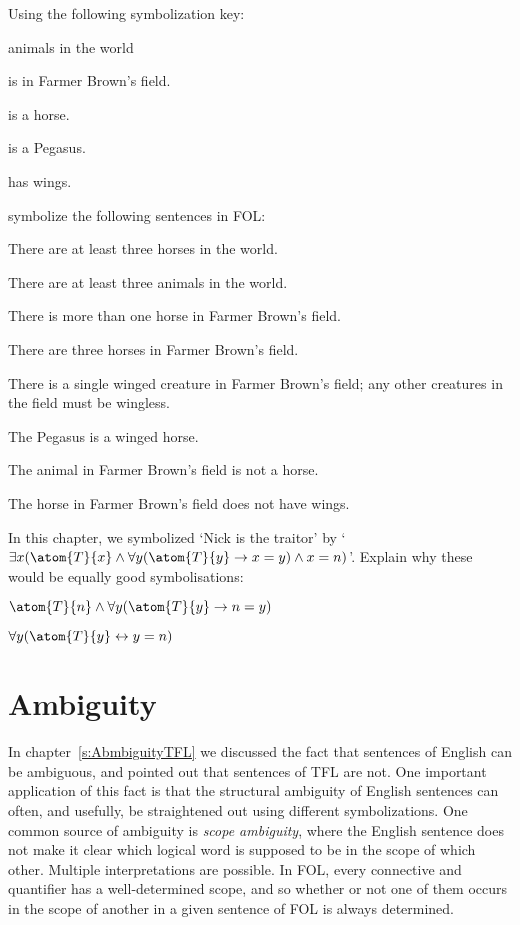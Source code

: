 \problempart Using the following symbolization key:
\begin{ekey}
\item[\text{domain}] animals in the world
\item[\atom{B}{x}]  is in Farmer Brown's field.
\item[\atom{H}{x}]  is a horse.
\item[\atom{P}{x}]  is a Pegasus.
\item[\atom{W}{x}]  has wings.
\end{ekey}
symbolize the following sentences in FOL:
\begin{earg}
\item There are at least three horses in the world.
\item There are at least three animals in the world.
\item There is more than one horse in Farmer Brown's field.
\item There are three horses in Farmer Brown's field.
\item There is a single winged creature in Farmer Brown's field; any other creatures in the field must be wingless.
\item The Pegasus is a winged horse.
\item The animal in Farmer Brown's field is not a horse.
\item The horse in Farmer Brown's field does not have wings.
\end{earg}

\problempart
In this chapter, we symbolized `Nick is the traitor' by `$\exists x (\atom{T}{x} \eand \forall y(\atom{T}{y} \eif x = y) \eand x = n)$'. Explain why these would be equally good symbolisations:
	\begin{ebullet}
		\item $\atom{T}{n} \eand \forall y(\atom{T}{y} \eif n = y)$
		\item $\forall y(\atom{T}{y} \eiff y = n)$
	\end{ebullet}


\chapter{Ambiguity}\label{s:ambiguityFOL}

In chapter~\ref{s:AbmbiguityTFL} we discussed the fact that sentences of English can be ambiguous, and pointed out that sentences of TFL are not. One important application of this fact is that the structural ambiguity of English sentences can often, and usefully, be straightened out using different symbolizations.  One common source of ambiguity is \emph{scope ambiguity}, where the English sentence does not make it clear which logical word is supposed to be in the scope of which other. Multiple interpretations are possible.  In FOL, every connective and quantifier has a well-determined scope, and so whether or not one of them occurs in the scope of another in a given sentence of FOL is always determined.

